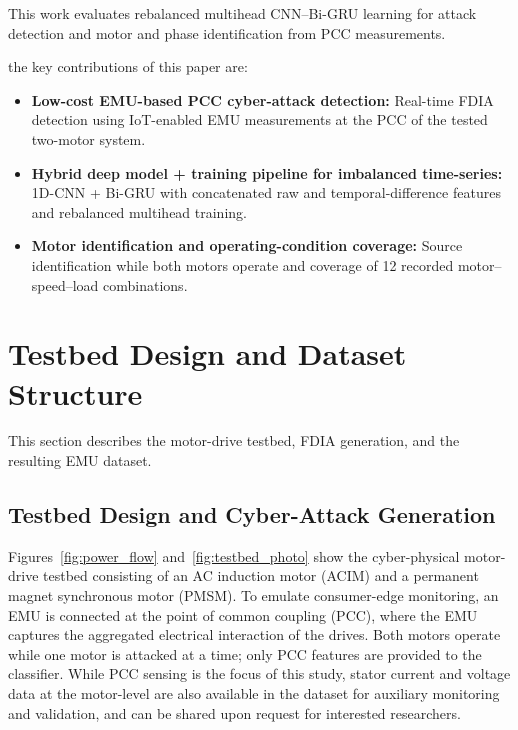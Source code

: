 \documentclass[conference,letterpaper]{IEEEtran}
\begin{document}
This work evaluates rebalanced multihead CNN--Bi-GRU learning for attack detection and motor and phase identification from PCC measurements.

the key contributions of this paper are:
\begin{itemize}
    \item \textbf{Low-cost EMU-based PCC cyber-attack detection:} Real-time FDIA detection using IoT-enabled EMU measurements at the PCC of the tested two-motor system.
    \item \textbf{Hybrid deep model + training pipeline for imbalanced time-series:} 1D-CNN + Bi-GRU with concatenated raw and temporal-difference features and rebalanced multihead training.
    \item \textbf{Motor identification and operating-condition coverage:} Source identification while both motors operate and coverage of 12 recorded motor--speed--load combinations.
\end{itemize}




\section{Testbed Design and Dataset Structure}
This section describes the motor-drive testbed, FDIA generation, and the resulting EMU dataset.

\subsection{Testbed Design and Cyber-Attack Generation}

Figures~\ref{fig:power_flow} and~\ref{fig:testbed_photo} show the cyber-physical motor-drive testbed consisting of an AC induction motor (ACIM)  and a permanent magnet synchronous motor (PMSM). To emulate consumer-edge monitoring, an EMU is connected at the point of common coupling (PCC), where the EMU captures the aggregated electrical interaction of the drives. Both motors operate while one motor is attacked at a time; only PCC features are provided to the classifier.
While PCC sensing is the focus of this study, stator current and voltage data at the motor-level are also available in the dataset for auxiliary monitoring and validation, and can be shared upon request for interested researchers.
\end{document}
